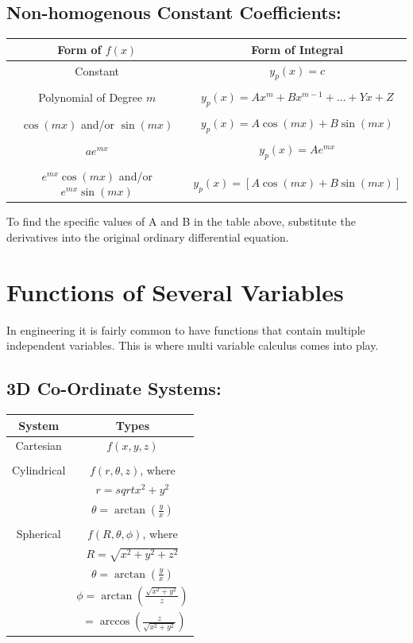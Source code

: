 \documentclass[a5paper]{article}
\begin{document}
	\subsection{Non-homogenous Constant Coefficients:}
	\begin{center}
	\begin{tabular}{ |c|c| }
		\hline
		Form of $f(x)$ & Form of Integral\\
		\hline
		Constant & $y_{p}(x)=c$\\
			 & \\
		Polynomial of Degree $m$ & $y_{p}(x)=Ax^{m}+Bx^{m-1}+\ldots+Yx+Z$\\
					 & \\
		$\cos{(mx)}$ and/or $\sin{(mx)}$ & $y_{p}(x)=A\cos{(mx)}+B\sin{(mx)}$\\
						 & \\
		$ae^{mx}$ & $y_{p}(x)=Ae^{mx}$\\
			  & \\
		$e^{mx}\cos{(mx)}$ and/or $e^{mx}\sin{(mx)}$ & $y_{p}(x)=[A\cos{(mx)}+B\sin{(mx)}]$\\
		\hline
	\end{tabular}
	\end{center}
	To find the specific values of A and B in the table above, substitute the derivatives into the original ordinary differential equation.

	\pagebreak

	\section{Functions of Several Variables}
	In engineering it is fairly common to have functions that contain multiple independent variables. This is where multi variable calculus comes into play.
	\subsection{3D Co-Ordinate Systems:}
	\begin{center}
	\begin{tabular}{ |c|c| }
		\hline
		System & Types\\
		\hline
		Cartesian & $f(x,y,z)$\\
			  & \\
		Cylindrical & $f(r,\theta,z)$, where\\
			    & $r=sqrt{x^{2}+y^{2}}$\\
			    & $\theta=\arctan{(\frac{y}{x})}$\\
			    & \\
		Spherical & $f(R,\theta,\phi)$, where\\
			  & $R=\sqrt{x^{2}+y^{2}+z^{2}}$\\
			  & $\theta=\arctan{(\frac{y}{x})}$\\
			  & $\phi=\arctan{(\frac{\sqrt{x^{2}+y^{2}}}{z})}$\\
			  & $\;=\arccos{(\frac{z}{\sqrt{x^{2}+y^{2}}})}$\\
		\hline
	\end{tabular}
	\end{center}
\end{document}

